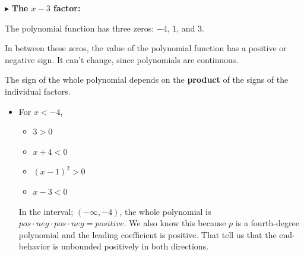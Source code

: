 \documentclass{ximera}
\begin{document}
\begin{example}
$\blacktriangleright$ \textbf{The $x-3$ factor:}

\begin{image}
  \end{image}


The polynomial function has three zeros: $-4$, $1$, and $3$. 

In between these zeros, the value of the polynomial function has a positive or negative sign. It can't change, since polynomials are continuous. 

The sign of the whole polynomial depends on the \textbf{\textcolor{purple!85!blue}{product}} of the signs of the individual factors.



\begin{itemize}
\item For $x < -4$, 
\begin{itemize}
  \item $3 > 0$
  \item $x+4 < 0$
  \item $(x-1)^2 > 0$
  \item $x-3 < 0$ 
\end{itemize}
In the interval; $(-\infty, -4)$, the whole polynomial is $pos \cdot neg \cdot pos \cdot neg = positive$.  We also know this because $p$ is a fourth-degree polynomial and the leading coefficient is positive. That tell us that the end-behavior is unbounded positively in both directions.



\end{itemize}
\end{example}
\end{document}

